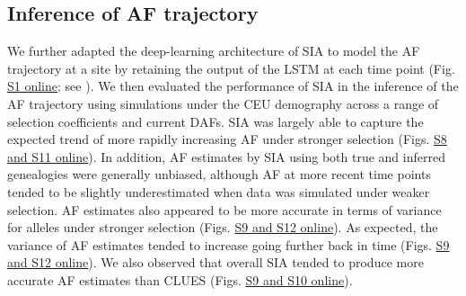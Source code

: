 \subsection{Inference of \ac{AF} trajectory}
We further adapted the deep-learning architecture of \ac{SIA} to model the \ac{AF} trajectory at a site by retaining the output of the \ac{LSTM} at each time point (Fig. \href{https://academic.oup.com/mbe/article/39/1/msab332/6433161?login=true#supplementary-data}{S1 online}; see ). We then evaluated the performance of \ac{SIA} in the inference of the \ac{AF} trajectory using simulations under the CEU demography across a range of selection coefficients and current \acp{DAF}. \ac{SIA} was largely able to capture the expected trend of more rapidly increasing \ac{AF} under stronger selection (Figs. \href{https://academic.oup.com/mbe/article/39/1/msab332/6433161?login=true#supplementary-data}{S8 and S11 online}). In addition, \ac{AF} estimates by \ac{SIA} using both true and inferred genealogies were generally unbiased, although \ac{AF} at more recent time points tended to be slightly underestimated when data was simulated under weaker selection. \ac{AF} estimates also appeared to be more accurate in terms of variance for alleles under stronger selection (Figs. \href{https://academic.oup.com/mbe/article/39/1/msab332/6433161?login=true#supplementary-data}{S9 and S12 online}). As expected, the variance of \ac{AF} estimates tended to increase going further back in time (Figs. \href{https://academic.oup.com/mbe/article/39/1/msab332/6433161?login=true#supplementary-data}{S9 and S12 online}). We also observed that overall \ac{SIA} tended to produce more accurate \ac{AF} estimates than CLUES (Figs. \href{https://academic.oup.com/mbe/article/39/1/msab332/6433161?login=true#supplementary-data}{S9 and S10 online}).

